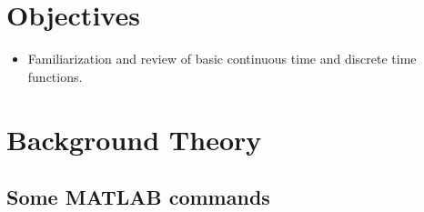 \documentclass{lab_sheet}
\begin{document}
\section{Objectives}
\begin{itemize}
    \item Familiarization and review of basic continuous time and discrete time functions.
\end{itemize}
\section{Background Theory}
\subsection{Some MATLAB commands}
\end{document}
